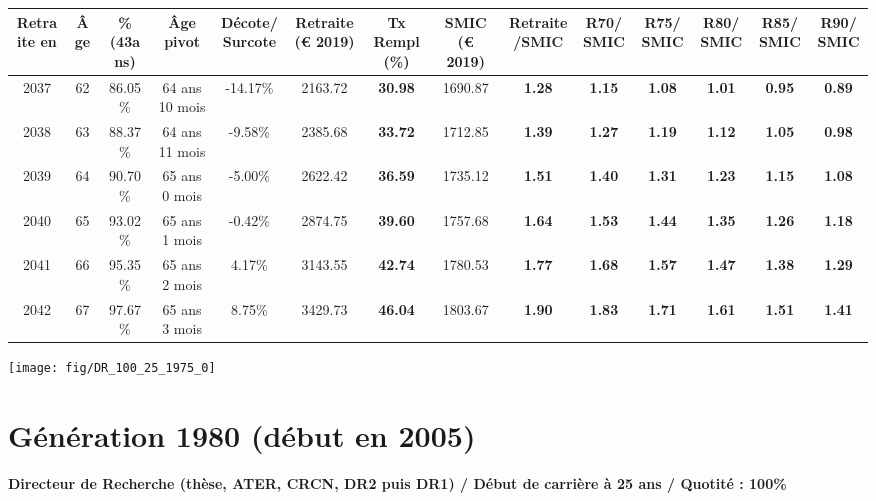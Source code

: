 \begin{adjustbox}{max width=\textwidth} 
\begin{tabular}[htb]{|c|c||c|c|c||c|c||c|c||c|c|c|c|c|} 
\hline 
 Retraite en &  Âge &  \%(43ans) &  Âge pivot &  Décote/Surcote &  Retraite (\euro{} 2019) &  Tx Rempl(\%) &  SMIC (\euro{} 2019) &  Retraite/SMIC &  R70/SMIC &  R75/SMIC &  R80/SMIC &  R85/SMIC &  R90/SMIC \\ 
\hline \hline 
 2037 &  62 &  86.05\% &  64 ans 10 mois &  -14.17\% &  2163.72 &  {\bf 30.98} &  1690.87 &  {\bf 1.28} &  {\bf 1.15} &  {\bf 1.08} &  {\bf 1.01} &  {\bf {\color{red} 0.95}} &  {\bf {\color{red} 0.89}} \\ 
\hline 
 2038 &  63 &  88.37\% &  64 ans 11 mois &  -9.58\% &  2385.68 &  {\bf 33.72} &  1712.85 &  {\bf 1.39} &  {\bf 1.27} &  {\bf 1.19} &  {\bf 1.12} &  {\bf 1.05} &  {\bf {\color{red} 0.98}} \\ 
\hline 
 2039 &  64 &  90.70\% &  65 ans 0 mois &  -5.00\% &  2622.42 &  {\bf 36.59} &  1735.12 &  {\bf 1.51} &  {\bf 1.40} &  {\bf 1.31} &  {\bf 1.23} &  {\bf 1.15} &  {\bf 1.08} \\ 
\hline 
 2040 &  65 &  93.02\% &  65 ans 1 mois &  -0.42\% &  2874.75 &  {\bf 39.60} &  1757.68 &  {\bf 1.64} &  {\bf 1.53} &  {\bf 1.44} &  {\bf 1.35} &  {\bf 1.26} &  {\bf 1.18} \\ 
\hline 
 2041 &  66 &  95.35\% &  65 ans 2 mois &  4.17\% &  3143.55 &  {\bf 42.74} &  1780.53 &  {\bf 1.77} &  {\bf 1.68} &  {\bf 1.57} &  {\bf 1.47} &  {\bf 1.38} &  {\bf 1.29} \\ 
\hline 
 2042 &  67 &  97.67\% &  65 ans 3 mois &  8.75\% &  3429.73 &  {\bf 46.04} &  1803.67 &  {\bf 1.90} &  {\bf 1.83} &  {\bf 1.71} &  {\bf 1.61} &  {\bf 1.51} &  {\bf 1.41} \\ 
\hline 
\hline 
\end{tabular} 
\end{adjustbox} 
 
 \vspace{0.1cm} 

 {\hspace{-2.2cm}\texttt{[image: fig/DR\_100\_25\_1975\_0]}} 

\newpage 
 
\section{Génération 1980 (début en 2005)\label{DR_100_25_1980_0}} 
 
{\bf \noindent Directeur de Recherche (thèse, ATER, CRCN, DR2 puis DR1) / Début de carrière à 25 ans / Quotité : 100\%}  ~ 

